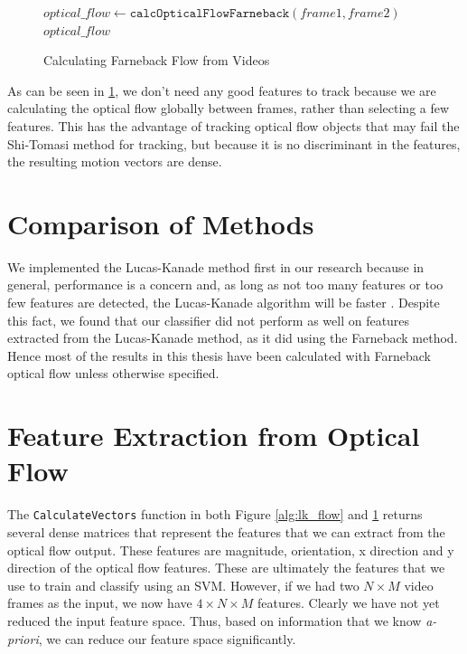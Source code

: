 \begin{figure}[h]
\begin{algorithmic}[1]
  \State $optical\_flow \gets \texttt{calcOpticalFlowFarneback}(frame1, frame2)$\\
  \Return $optical\_flow$
\EndProcedure
\end{algorithmic}
\caption{Calculating Farneback Flow from Videos}
\label{alg:farneback}
\end{figure}

As can be seen in \ref{alg:farneback}, we don't need any good features to track
because we are calculating the optical flow globally between frames, rather than
selecting a few features. This has the advantage of tracking optical flow objects
that may fail the Shi-Tomasi method for tracking, but because it is no discriminant
in the features, the resulting motion vectors are dense.


\section{\label{section:comparison}Comparison of Methods}
We implemented the Lucas-Kanade method first in our research because in general,
performance is a concern and, as long as not too many features or
too few features are detected, the Lucas-Kanade algorithm will be faster
\cite{de2015choosing}. Despite this fact, we found that our classifier did
not perform as well on features extracted from the Lucas-Kanade method, as it
did using the Farneback method. Hence most of the results in this thesis
have been calculated with Farneback optical flow unless otherwise specified.

\section{\label{section:feature_extraction}Feature Extraction from Optical Flow}
The \texttt{CalculateVectors} function in both Figure \ref{alg:lk_flow} and
\ref{alg:farneback} returns several dense matrices that represent the features
that we can extract from the optical flow output. These features are magnitude,
orientation, x direction and y direction of the optical flow features. These are
ultimately the features that we use to train and classify using an SVM. However,
if we had two $N \times M$ video frames as the input, we now have $4 \times N
\times M$ features. Clearly we have not yet reduced the input feature space.
Thus, based on information that we know \textit{a-priori}, we can reduce our
feature space significantly.

